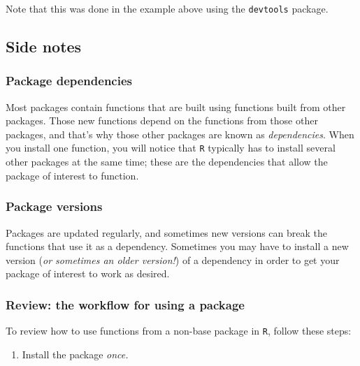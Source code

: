 \documentclass[
]{book}
\providecommand{\tightlist}{%
  \setlength{\itemsep}{0pt}\setlength{\parskip}{0pt}}
\begin{document}
Note that this was done in the example above using the \texttt{devtools} package.

\hypertarget{side-notes}{%
\subsection*{Side notes}\label{side-notes}}

\hypertarget{package-dependencies}{%
\subsubsection*{Package dependencies}\label{package-dependencies}}

Most packages contain functions that are built using functions built from other packages. Those new functions depend on the functions from those other packages, and that's why those other packages are known as \emph{dependencies}. When you install one function, you will notice that \texttt{R} typically has to install several other packages at the same time; these are the dependencies that allow the package of interest to function.

\hypertarget{package-versions}{%
\subsubsection*{Package versions}\label{package-versions}}

Packages are updated regularly, and sometimes new versions can break the functions that use it as a dependency. Sometimes you may have to install a new version (\emph{or sometimes an older version!}) of a dependency in order to get your package of interest to work as desired.

\hypertarget{review-the-workflow-for-using-a-package}{%
\subsubsection*{Review: the workflow for using a package}\label{review-the-workflow-for-using-a-package}}

To review how to use functions from a non-base package in \texttt{R}, follow these steps:

\begin{enumerate}
\def\labelenumi{\arabic{enumi}.}
\tightlist
\item
  Install the package \emph{once.}
\end{enumerate}
\end{document}
